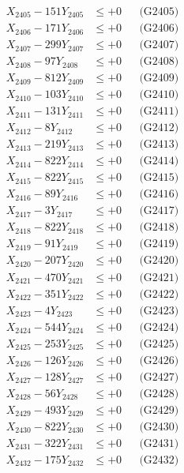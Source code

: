 \documentclass[a4paper,10pt]{article}
\begin{document}
{\begin{align}
X_{2405} - 151Y_{2405} &\leq +0 && \text{(G2405)} \\
X_{2406} - 171Y_{2406} &\leq +0 && \text{(G2406)} \\
X_{2407} - 299Y_{2407} &\leq +0 && \text{(G2407)} \\
X_{2408} - 97Y_{2408} &\leq +0 && \text{(G2408)} \\
X_{2409} - 812Y_{2409} &\leq +0 && \text{(G2409)} \\
X_{2410} - 103Y_{2410} &\leq +0 && \text{(G2410)} \\
\allowbreak
X_{2411} - 131Y_{2411} &\leq +0 && \text{(G2411)} \\
X_{2412} - 8Y_{2412} &\leq +0 && \text{(G2412)} \\
X_{2413} - 219Y_{2413} &\leq +0 && \text{(G2413)} \\
X_{2414} - 822Y_{2414} &\leq +0 && \text{(G2414)} \\
X_{2415} - 822Y_{2415} &\leq +0 && \text{(G2415)} \\
X_{2416} - 89Y_{2416} &\leq +0 && \text{(G2416)} \\
X_{2417} - 3Y_{2417} &\leq +0 && \text{(G2417)} \\
X_{2418} - 822Y_{2418} &\leq +0 && \text{(G2418)} \\
X_{2419} - 91Y_{2419} &\leq +0 && \text{(G2419)} \\
X_{2420} - 207Y_{2420} &\leq +0 && \text{(G2420)} \\
\allowbreak
X_{2421} - 470Y_{2421} &\leq +0 && \text{(G2421)} \\
X_{2422} - 351Y_{2422} &\leq +0 && \text{(G2422)} \\
X_{2423} - 4Y_{2423} &\leq +0 && \text{(G2423)} \\
X_{2424} - 544Y_{2424} &\leq +0 && \text{(G2424)} \\
X_{2425} - 253Y_{2425} &\leq +0 && \text{(G2425)} \\
X_{2426} - 126Y_{2426} &\leq +0 && \text{(G2426)} \\
X_{2427} - 128Y_{2427} &\leq +0 && \text{(G2427)} \\
X_{2428} - 56Y_{2428} &\leq +0 && \text{(G2428)} \\
X_{2429} - 493Y_{2429} &\leq +0 && \text{(G2429)} \\
X_{2430} - 822Y_{2430} &\leq +0 && \text{(G2430)} \\
\allowbreak
X_{2431} - 322Y_{2431} &\leq +0 && \text{(G2431)} \\
X_{2432} - 175Y_{2432} &\leq +0 && \text{(G2432)} \\

\end{align}}
\end{document}
